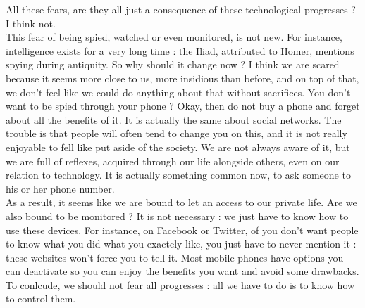 \documentclass{article}
\begin{document}
\bigskip
All these fears, are they all just a consequence of these technological progresses ? I think not.\\
This fear of being spied, watched or even monitored, is not new. For instance, intelligence exists for a very long time : the Iliad, attributed to Homer, mentions spying during antiquity. So why should it change now ? I think we are scared because it seems more close to us, more insidious than before, and on top of that, we don't feel like we could do anything about that without sacrifices. 
You don't want to be spied through your phone ? Okay, then do not buy a phone and forget about all the benefits of it. It is actually the same about social networks. The trouble is that people will often tend to change you on this, and it is not really enjoyable to fell like put aside of the society. We are not always aware of it, but we are full of reflexes, acquired through our life alongside others, even on our relation to technology. It is actually something common now, to ask someone to his or her phone number.\\
As a result, it seems like we are bound to let an access to our private life. Are we also bound to be monitored ? It is not necessary : we just have to know how to use these devices. For instance, on Facebook or Twitter, of you don't want people to know what you did what you exactely like, you just have to never mention it : these websites won't force you to tell it. Most mobile phones have options you can deactivate so you can enjoy the benefits you want and avoid some drawbacks.\\
To conlcude, we should not fear all progresses : all we have to do is to know how to control them.  
 
\end{document}
